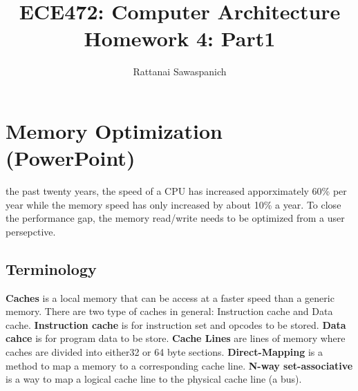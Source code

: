 \documentclass[journal]{IEEEtran}
\begin{document}
\title{ECE472: Computer Architecture\\ Homework 4: Part1}
\author{Rattanai Sawaspanich}

\maketitle

\section{Memory Optimization (PowerPoint)}
 
 the past twenty years, the speed of a CPU has increased 
apporximately 60\% per year while the memory speed has only increased by 
about 10\% a year. To close the performance gap, the memory read/write needs
to be optimized from a user persepctive.\\


\subsection{Terminology}
\textbf{Caches} is a local memory that can be access at a faster speed than
a generic memory. There are two type of caches in general: Instruction cache
and Data cache. \textbf{Instruction cache} is for instruction set and opcodes
to be stored. \textbf{Data cahce} is for program data to be store. 
\newline
\newline
\textbf{Cache Lines} are lines of memory where caches are divided into either32 or 64 byte sections.
\textbf{Direct-Mapping} is a method to map a memory to a corresponding
cache line.
\textbf{N-way set-associative} is a way to map a logical cache line to the
physical cache line (a bus).
\end{document}
